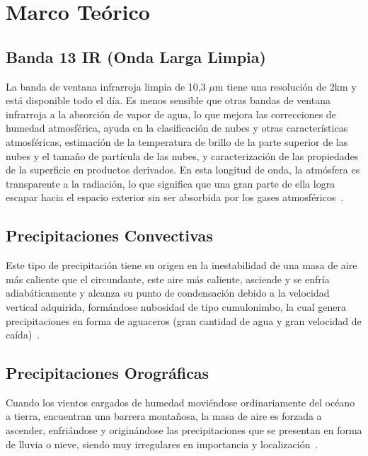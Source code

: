 \documentclass[twocolumn]{IECEjournal} %
\begin{document}
\section{Marco Teórico}
\subsection{Banda 13 IR (Onda Larga Limpia)}
La banda de ventana infrarroja limpia de 10,3 $\mu$m tiene una resolución de 2km y está disponible todo el día. Es menos sensible que otras bandas de ventana infrarroja a la absorción de vapor de agua, lo que mejora las correcciones de humedad atmosférica, ayuda en la clasificación de nubes y otras características atmosféricas, estimación de la temperatura de brillo de la parte superior de las nubes y el tamaño de partícula de las nubes, y caracterización de las propiedades de la superficie en productos derivados.
En esta longitud de onda, la atmósfera es transparente a la radiación, lo que significa que una gran parte de ella logra escapar hacia el espacio exterior sin ser absorbida por los gases atmosféricos~\cite{5}.

\subsection{Precipitaciones Convectivas}
Este tipo de precipitación tiene su origen en la inestabilidad de una masa de  aire más caliente que el circundante, este aire más caliente, asciende y se enfría  adiabáticamente y alcanza su punto de condensación debido a la velocidad vertical adquirida, formándose nubosidad de tipo cumulonimbo, la cual genera  precipitaciones en forma de aguaceros (gran cantidad de agua y gran velocidad de caída)~\cite{6}.
\subsection{Precipitaciones Orográficas}
Cuando los vientos cargados de humedad moviéndose ordinariamente del 
océano a tierra, encuentran una barrera montañosa, la masa de aire es forzada a  ascender, enfriándose y originándose las precipitaciones que se presentan en forma  de lluvia o nieve, siendo muy irregulares en importancia y localización~\cite{6}.
\end{document}
